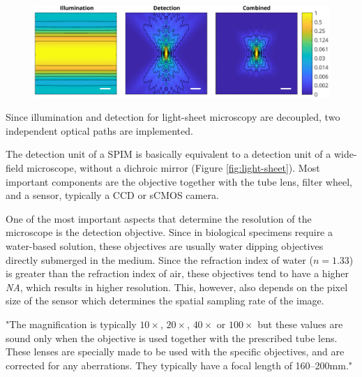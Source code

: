    \begin{figure}
        \centering
        \includegraphics[width=1\textwidth]{psfs/psf_spim.pdf}
        \label{fig:psf-spim}
    \end{figure}


    Since illumination and detection for light-sheet microscopy are decoupled, two independent optical paths are implemented.

    The detection unit of a SPIM is basically equivalent to a detection unit of a wide-field microscope, without a dichroic mirror (Figure \ref{fig:light-sheet}). Most important components are the objective together with the tube lens, filter wheel, and a sensor, typically a CCD or sCMOS camera.

    One of the most important aspects that determine the resolution of the microscope is the detection objective. Since in biological specimens require a water-based solution, these objectives are usually water dipping objectives directly submerged in the medium. Since the refraction index of water ($n=1.33$) is greater than the refraction index of air, these objectives tend to have a higher \textit{NA}, which results in higher resolution. This, however, also depends on the pixel size of the sensor which determines the spatial sampling rate of the image.

    "The magnification is typically $10\times$, $20\times$, $40\times$ or $100\times$ but these values are sound only when the objective is used together with the prescribed tube lens. These lenses are specially made to be used with the specific objectives, and are corrected for any aberrations. They typically have a focal length of 160--200mm."


